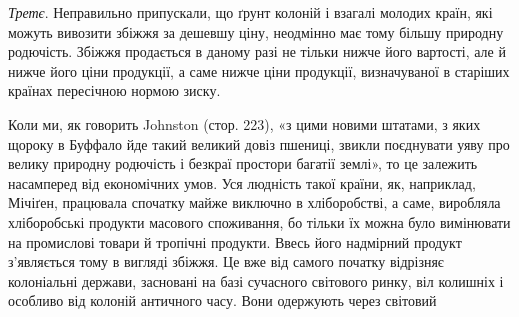 \emph{Третє}. Неправильно припускали, що ґрунт колоній і взагалі молодих
країн, які можуть вивозити збіжжя за дешевшу ціну, неодмінно має тому більшу
природну родючість. Збіжжя продається в даному разі не тільки нижче його
вартості, але й нижче його ціни продукції, а саме нижче ціни продукції, визначуваної
в старіших країнах пересічною нормою зиску.

Коли ми, як говорить Johnston (стор. 223), «з цими новими штатами, з
яких щороку в Буффало йде такий великий довіз пшениці, звикли поєднувати
уяву про велику природну родючість і безкраї простори багатії землі», то це
залежить насамперед від економічних умов. Уся людність такої країни, як, наприклад,
Мічіґен, працювала спочатку майже виключно в хліборобстві, а саме,
виробляла хліборобські продукти масового споживання, бо тільки їх можна було
вимінювати на промислові товари й тропічні продукти. Ввесь його надмірний продукт
з’являється тому в вигляді збіжжя. Це вже від самого початку відрізняє
колоніальні держави, засновані на базі сучасного світового ринку, віл
колишніх і особливо від колоній античного часу. Вони одержують через світовий
\parbreak{}  %
